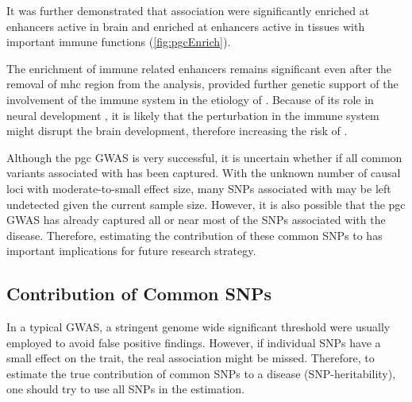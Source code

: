 	It was further demonstrated that  association were significantly enriched at enhancers active in brain and enriched at enhancers active in tissues with important immune functions (\cref{fig:pgcEnrich})\citep{Ripke2014}.
	
	The enrichment of immune related enhancers remains significant even after the removal of \gls{mhc} region from the analysis, provided further genetic support of the involvement of the immune system in the etiology of .
	Because of its role in neural development \citep{Zhao1998,Deverman2009}, it is likely that the perturbation in the immune system might disrupt the brain development, therefore increasing the risk of .
	
	Although the \gls{pgc}  \gls{GWAS} is very successful, it is uncertain whether if all common variants associated with  has been captured. 
	With the unknown number of causal loci with moderate-to-small effect size, many \glspl{SNP} associated with  may be left undetected given the current sample size. 
	However, it is also possible that the \gls{pgc}  \gls{GWAS} has already captured all or near most of the \glspl{SNP} associated with the disease. 
	Therefore, estimating the contribution of these common \glspl{SNP} to  has important implications for future research strategy.
	
	\subsection{Contribution of Common SNPs}
	In a typical \gls{GWAS}, a stringent genome wide significant threshold were usually employed to avoid false positive findings. 
	However, if individual \glspl{SNP} have a small effect on the trait, the real association might be missed.
	Therefore, to estimate the true contribution of common \glspl{SNP} to a disease (\gls{SNP}-heritability), one should try to use all \glspl{SNP} in the estimation.
	
